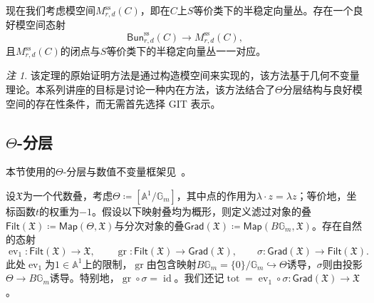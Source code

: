 \documentclass{amsart}
\theoremstyle{definition}
\theoremstyle{remark}
\newtheorem{rmk}[thm]{注}
\theoremstyle{plain}
\theoremstyle{definition}
\theoremstyle{remark}
\newcommand{\A}{\mathbb{A}}
\newcommand{\G}{\mathbb{G}}
\newcommand{\mf}[1]{\mathfrak{#1}}
\newcommand{\mr}[1]{\mathrm{#1}}
\newcommand{\on}[1]{\operatorname{#1}}
\newcommand{\ms}[1]{\mathsf{#1}}
\newcommand{\1}{\mathbf{1}}
\newcommand{\2}{\mathbf{2}}
\newcommand{\3}{\mathbf{3}}
\DeclareMathOperator{\ev}{ev}
\begin{document}
现在我们考虑模空间\(M_{r,d}^{\mr{ss}}(C)\)，即在\(C\)上\(S\)等价类下的半稳定向量丛。存在一个良好模空间态射
\[
    \ms{Bun}_{r,d}^{\mr{ss}}(C)\longrightarrow M_{r,d}^{\mr{ss}}(C),
\]
且\(M_{r,d}^{\mr{ss}}(C)\)的闭点与\(S\)等价类下的半稳定向量丛一一对应。

\begin{rmk}
该定理的原始证明方法是通过构造模空间来实现的，该方法基于几何不变量理论。本系列讲座的目标是讨论一种内在方法，该方法结合了\(\Theta\)分层结构与良好模空间的存在性条件，而无需首先选择 GIT 表示。
\end{rmk}


\subsection{\(\Theta\)-分层}%
\label{sub:Theta-stratifications}

本节使用的\(\Theta\)-分层与数值不变量框架见~\cite{HLinstability}。

设\(\mf{X}\)为一个代数叠，考虑\(\Theta\coloneqq[\A^1/\G_m]\)，其中点的作用为\(\lambda\cdot z=\lambda z\)；等价地，坐标函数\(t\)的权重为\(-1\)。假设以下映射叠均为概形，则定义滤过对象的叠\(\ms{Filt}(\mf{X})\coloneqq\ms{Map}(\Theta,\mf{X})\)与分次对象的叠\(\ms{Grad}(\mf{X})\coloneqq\ms{Map}(B\G_m,\mf{X})\)。存在自然的态射
\[
    \ev_1\colon\ms{Filt}(\mf{X})\to\mf{X},
    \qquad
    \on{gr}\colon\ms{Filt}(\mf{X})\to\ms{Grad}(\mf{X}),
    \qquad
    \sigma\colon\ms{Grad}(\mf{X})\to\ms{Filt}(\mf{X}).
\]
此处\(\ev_1\)为\(1\in\A^1\)上的限制，\(\on{gr}\)由包含映射\(B\G_m=\{0\}/\G_m\hookrightarrow\Theta\)诱导，\(\sigma\)则由投影\(\Theta\to B\G_m\)诱导。特别地，\(\on{gr}\circ\sigma=\on{id}\)。我们还记\(\on{tot}=\ev_1\circ\sigma\colon\ms{Grad}(\mf{X})\to\mf{X}\)。
\end{document}
